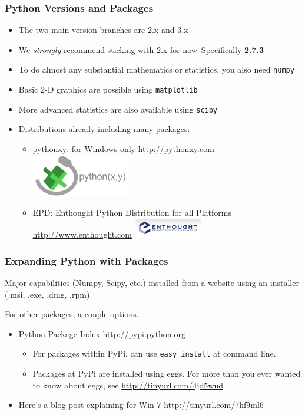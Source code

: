 \documentclass{beamer}
\begin{document}
\begin{frame}[fragile]
\frametitle{Python Versions and Packages}
\begin{itemize}
\item{The two main version branches are 2.x and 3.x}
\item{We \emph{strongly} recommend sticking with 2.x \newline{}for now--Specifically \bf{2.7.3}}
\item{To do almost any substantial mathematics or statistics, you also need \texttt{numpy}}
\item{Basic 2-D graphics are possible using \texttt{matplotlib}}
\item{More advanced statistics are also available using \texttt{scipy}}
\item{Distributions already including many packages:}
\begin{itemize}
\item {pythonxy: for Windows only \url{http://pythonxy.com}\includegraphics[scale=0.4]{figures/pythonxy.png}}
\item {EPD: Enthought Python Distribution for all Platforms \url{http://www.enthought.com}
\includegraphics[width=3cm,height=.86cm]{figures/enthought.png}}
\end{itemize}
\end{itemize}
\end{frame}

\begin{frame}[fragile]
\frametitle{Expanding Python with Packages}

Major capabilities (Numpy, Scipy, etc.) installed from a website using an installer (.msi, .exe, .dmg, .rpm)

For other packages, a couple options...
\begin{itemize}
\item Python Package Index \url{http://pypi.python.org}
\begin{itemize}
\item {For packages within PyPi, can use \texttt{easy\_install} at command line.}
\item {Packages at PyPi are installed using eggs. For more than you ever wanted to
 know about eggs, see \url{http://tinyurl.com/4jd5wud}}
\end{itemize}
\item Here's a blog post explaining for Win 7 \url{http://tinyurl.com/7hf9ml6}
\end{itemize}
\end{frame}
\end{document}
